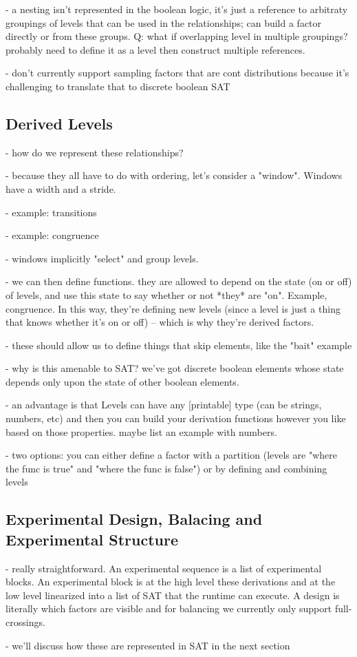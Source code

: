 - a nesting isn't represented in the boolean logic, it's just a reference to arbitraty groupings of levels that can be used in the relationships; can build a factor directly or from these groups. Q: what if overlapping level in multiple groupings? probably need to define it as a level then construct multiple references.

- don't currently support sampling factors that are cont distributions because it's challenging to translate that to discrete boolean SAT

\subsection{Derived Levels}
- how do we represent these relationships?

- because they all have to do with ordering, let's consider a "window". Windows have a width and a stride.

- example: transitions

- example: congruence

- windows implicitly "select" and group levels.

- we can then define functions. they are allowed to depend on the state (on or off) of levels, and use this state to say whether or not *they* are "on". Example, congruence. In this way, they're defining new levels (since a level is just a thing that knows whether it's on or off) -- which is why they're derived factors.

- these should allow us to define things that skip elements, like the "bait" example

- why is this amenable to SAT? we've got discrete boolean elements whose state depends only upon the state of other boolean elements.

- an advantage is that Levels can have any [printable] type (can be strings, numbers, etc) and then you can build your derivation functions however you like based on those properties. maybe list an example with numbers.

- two options: you can either define a factor with a partition (levels are "where the func is true" and "where the func is false") or by defining and combining levels

\subsection{Experimental Design, Balacing and Experimental Structure}

- really straightforward. An experimental sequence is a list of experimental blocks. An experimental block is at the high level these derivations and at the low level linearized into a list of SAT that the runtime can execute. A design is literally which factors are visible and for balancing we currently only support full-crossings.

- we'll discuss how these are represented in SAT in the next section
